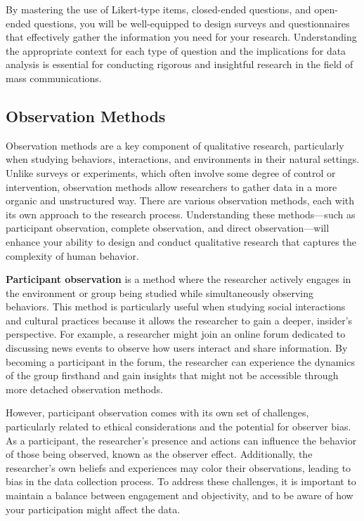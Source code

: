 \documentclass[
]{book}
\begin{document}
By mastering the use of Likert-type items, closed-ended questions, and open-ended questions, you will be well-equipped to design surveys and questionnaires that effectively gather the information you need for your research. Understanding the appropriate context for each type of question and the implications for data analysis is essential for conducting rigorous and insightful research in the field of mass communications.

\subsection{Observation Methods}\label{observation-methods}

Observation methods are a key component of qualitative research, particularly when studying behaviors, interactions, and environments in their natural settings. Unlike surveys or experiments, which often involve some degree of control or intervention, observation methods allow researchers to gather data in a more organic and unstructured way. There are various observation methods, each with its own approach to the research process. Understanding these methods---such as participant observation, complete observation, and direct observation---will enhance your ability to design and conduct qualitative research that captures the complexity of human behavior.

\textbf{Participant observation} is a method where the researcher actively engages in the environment or group being studied while simultaneously observing behaviors. This method is particularly useful when studying social interactions and cultural practices because it allows the researcher to gain a deeper, insider's perspective. For example, a researcher might join an online forum dedicated to discussing news events to observe how users interact and share information. By becoming a participant in the forum, the researcher can experience the dynamics of the group firsthand and gain insights that might not be accessible through more detached observation methods.

However, participant observation comes with its own set of challenges, particularly related to ethical considerations and the potential for observer bias. As a participant, the researcher's presence and actions can influence the behavior of those being observed, known as the observer effect. Additionally, the researcher's own beliefs and experiences may color their observations, leading to bias in the data collection process. To address these challenges, it is important to maintain a balance between engagement and objectivity, and to be aware of how your participation might affect the data.
\end{document}
